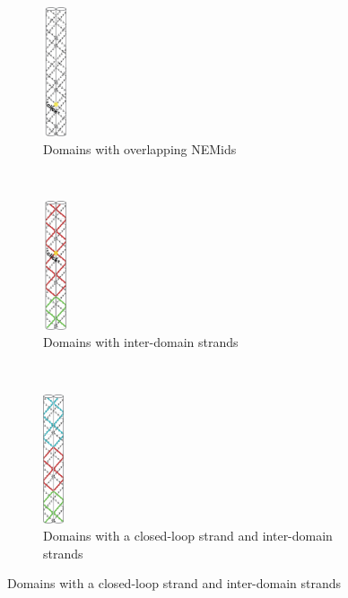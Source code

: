 \documentclass[
titlepage,
fontsize=12pt
]{article}
\begin{document}
	\begin{figure}[h]
		\centering
		\caption{Creating cross-strand junctions}
		\label{fig:creating-junctions}
		
		\begin{subfigure}{.3\textwidth}
			\centering
			\includegraphics[height=1.5in]{creating-junctions-1.png}
			\caption{Domains with overlapping NEMids}
		\end{subfigure}%
		~
		\begin{subfigure}{.3\textwidth}
			\centering
			\includegraphics[height=1.5in]{creating-junctions-2.png}
			\caption{Domains with inter-domain strands}
		\end{subfigure}%
		~
		\begin{subfigure}{.3\textwidth}
			\centering
			\includegraphics[height=1.5in]{creating-junctions-3.png}
			\caption{Domains with a closed-loop strand and inter-domain strands}
		\end{subfigure}
	\end{figure}
	
\end{document}
